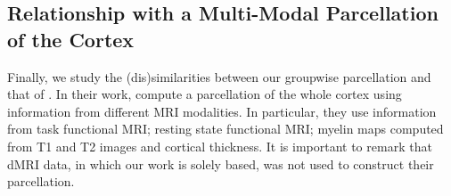 \begin{table}[t]
\centering
{}
% 
\vspace{0.3cm}
\caption*{Table 3. Minimum; maximum and mean z-score contained by each of the 
          parcels enumerated in figure \ref{fig:function_cognition}. The
          highest z-score of each map is reported to facilitate comparison. Faces-Shapes: 
          Face recognition versus shape recognition contrast; Shapes-Faces: Shape recognition
          versus face recognition; Story: Short story categorization.}
\end{table}
%
\subsection{Relationship with a Multi-Modal Parcellation of the Cortex}
Finally, we study the (dis)similarities between our groupwise parcellation and that
of \citet{Glasser2016}. In their work, \citet{Glasser2016} compute a parcellation
of the whole cortex using information from different MRI modalities. In particular,
they use information from task functional MRI; resting state functional MRI;
myelin maps computed from T1 and T2 images and cortical thickness. It is important
to remark that dMRI data, in which our work is solely based, was not used to construct 
their parcellation.

